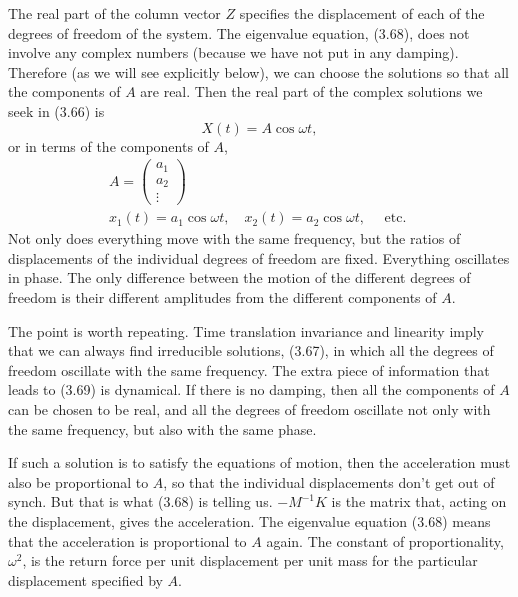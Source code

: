 \documentclass[main.tex]{subfiles}
\begin{document}
The real part of the column vector $Z$ specifies the displacement of each of the degrees of freedom of the system. The eigenvalue equation, (3.68), does not involve any complex numbers (because we have not put in any damping). Therefore (as we will see explicitly below), we can choose the solutions so that all the components of $A$ are real. Then the real part of the complex solutions we seek in (3.66) is
$$
X(t)=A \cos \omega t,
$$
or in terms of the components of $A$,
$$
\begin{gathered}
A=\left(\begin{array}{c}
a_1 \\
a_2 \\
\vdots
\end{array}\right) \\
x_1(t)=a_1 \cos \omega t, \quad x_2(t)=a_2 \cos \omega t, \quad \text { etc. }
\end{gathered}
$$
Not only does everything move with the same frequency, but the ratios of displacements of the individual degrees of freedom are fixed. Everything oscillates in phase. The only difference between the motion of the different degrees of freedom is their different amplitudes from the different components of $A$.

The point is worth repeating. Time translation invariance and linearity imply that we can always find irreducible solutions, (3.67), in which all the degrees of freedom oscillate with the same frequency. The extra piece of information that leads to (3.69) is dynamical. If there is no damping, then all the components of $A$ can be chosen to be real, and all the degrees of freedom oscillate not only with the same frequency, but also with the same phase.

If such a solution is to satisfy the equations of motion, then the acceleration must also be proportional to $A$, so that the individual displacements don't get out of synch. But that is what (3.68) is telling us. $-M^{-1} K$ is the matrix that, acting on the displacement, gives the acceleration. The eigenvalue equation (3.68) means that the acceleration is proportional to $A$ again. The constant of proportionality, $\omega^2$, is the return force per unit displacement per unit mass for the particular displacement specified by $A$.
\end{document}

